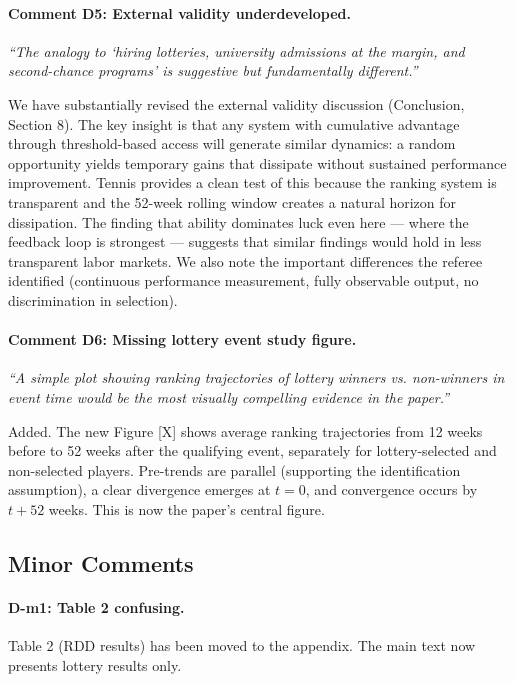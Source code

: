 \documentclass[12pt]{article}
\newcommand{\resp}[1]{\textcolor{response}{#1}}
\begin{document}
\paragraph{Comment D5: External validity underdeveloped.}
\textit{``The analogy to `hiring lotteries, university admissions at the margin, and second-chance programs' is suggestive but fundamentally different.''}

\resp{We have substantially revised the external validity discussion (Conclusion, Section 8). The key insight is that any system with cumulative advantage through threshold-based access will generate similar dynamics: a random opportunity yields temporary gains that dissipate without sustained performance improvement. Tennis provides a clean test of this because the ranking system is transparent and the 52-week rolling window creates a natural horizon for dissipation. The finding that ability dominates luck even here --- where the feedback loop is strongest --- suggests that similar findings would hold in less transparent labor markets. We also note the important differences the referee identified (continuous performance measurement, fully observable output, no discrimination in selection).}

\paragraph{Comment D6: Missing lottery event study figure.}
\textit{``A simple plot showing ranking trajectories of lottery winners vs. non-winners in event time would be the most visually compelling evidence in the paper.''}

\resp{Added. The new Figure [X] shows average ranking trajectories from 12 weeks before to 52 weeks after the qualifying event, separately for lottery-selected and non-selected players. Pre-trends are parallel (supporting the identification assumption), a clear divergence emerges at $t = 0$, and convergence occurs by $t + 52$ weeks. This is now the paper's central figure.}

\subsection*{Minor Comments}

\paragraph{D-m1: Table 2 confusing.}
\resp{Table 2 (RDD results) has been moved to the appendix. The main text now presents lottery results only.}
\end{document}
